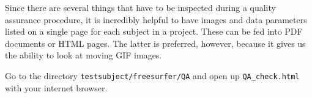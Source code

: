 Since there are several things that have to be inspected during a quality assurance procedure, it is incredibly helpful to have images and data parameters listed on a single page for each subject in a project. These can be fed into PDF documents or HTML pages. The latter is preferred, however, because it gives us the ability to look at moving GIF images. 

Go to the directory \texttt{testsubject/freesurfer/QA} and open up \texttt{QA_check.html} with your internet browser. 











